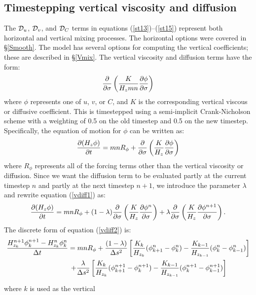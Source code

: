 \subsection{Timestepping vertical viscosity and diffusion} \label{Vfric}
The ${\cal D}_u$, ${\cal D}_v$, and ${\cal D}_C$ terms in equations
(\ref{st13})--(\ref{st15}) represent both horizontal and vertical mixing
processes.  The horizontal options were covered in \S\ref{Smooth}. The
model has several options for computing the vertical coefficients;
these are described in \S\ref{Vmix}.  The vertical viscosity and
diffusion terms have the form: \begin{equation}
   {\partial \over \partial \sigma} \left( {K \over H_z mn} {\partial
   \phi \over \partial \sigma} \right)
\end{equation} where $\phi$ represents one of $u$, $v$, or $C$, and $K$
is the corresponding vertical viscous or diffusive coefficient. This is
timestepped using a semi-implicit Crank-Nicholson scheme with a weighting
of 0.5 on the old timestep and 0.5 on the new timestep.  Specifically,
the equation of motion for $\phi$ can be written as: \begin{equation}
  {\partial (H_z \phi) \over \partial t} = mnR_{\phi} + {\partial \over
  \partial \sigma} \left( {K \over H_z} {\partial \phi \over \partial
  \sigma} \right)
\label{vdiff1} \end{equation} where $R_{\phi}$ represents all of the
forcing terms other than the vertical viscosity or diffusion.  Since we
want the diffusion term to be evaluated partly at the current timestep
$n$ and partly at the next timestep $n+1$, we introduce the parameter
$\lambda$ and rewrite equation (\ref{vdiff1}) as: \begin{equation}
  {\partial (H_z \phi) \over \partial t} = mnR_{\phi} + (1-\lambda)
  {\partial \over \partial \sigma} \left( {K \over H_z} {\partial \phi^n
  \over \partial \sigma} \right) + \lambda {\partial \over \partial
  \sigma} \left( {K \over H_z} {\partial \phi^{n+1} \over \partial \sigma}
  \right) .
\label{vdiff2} \end{equation} The discrete form of equation (\ref{vdiff2})
is: \begin{multline}
   {H_{z_k}^{n+1} \phi_k^{n+1} - H_{z_k}^n \phi_k^n \over \Delta t} = mn
   R_{\phi} + {(1-\lambda) \over \Delta s^2} \left[ {K_k \over H_{z_k}}
   (\phi_{k+1}^n - \phi_k^n) - {K_{k-1} \over H_{z_{k-1}}} (\phi_k^n -
   \phi_{k-1}^n) \right]
\\ \vspace{1mm}
 \qquad \qquad \qquad  + {\lambda \over \Delta s^2} \left[
   {K_k \over H_{z_k}} (\phi_{k+1}^{n+1} - \phi_k^{n+1}) - {K_{k-1}
   \over H_{z_{k-1}}} (\phi_k^{n+1} - \phi_{k-1}^{n+1}) \right]
\label{vdiff3} \end{multline} where $k$ is used as the vertical
